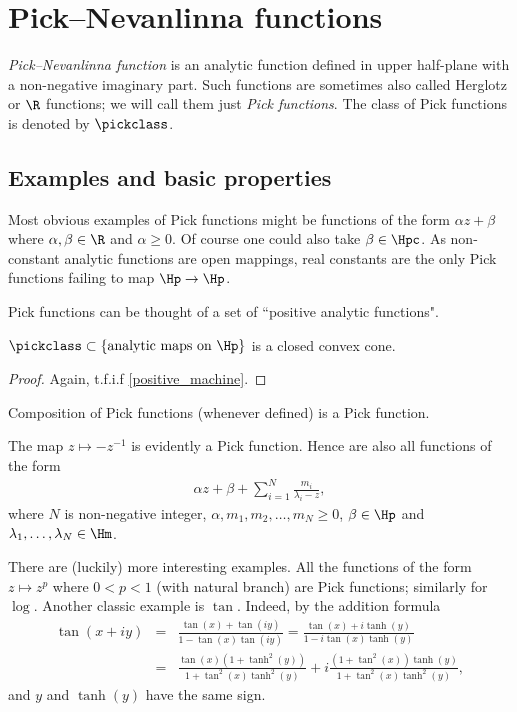 \chapter{Pick--Nevanlinna functions}

\textit{Pick--Nevanlinna function} is an analytic function defined in upper half-plane with a non-negative imaginary part. Such functions are sometimes also called Herglotz or $\R$ functions; we will call them just \textit{Pick functions}. The class of Pick functions is denoted by $\pickclass$.

\section{Examples and basic properties}

Most obvious examples of Pick functions might be functions of the form $\alpha z + \beta$ where $\alpha, \beta \in \R$ and $\alpha \geq 0$. Of course one could also take $\beta \in \Hpc$. As non-constant analytic functions are open mappings, real constants are the only Pick functions failing to map $\Hp \to \Hp$.

Pick functions can be thought of a set of ``positive analytic functions".

\begin{lause}
	$\pickclass \subset \{\text{analytic maps on $\Hp$} \}$ is a closed convex cone.
\end{lause}
\begin{proof}
	Again, t.f.i.f \ref{positive_machine}.
\end{proof}

Composition of Pick functions (whenever defined) is a Pick function.

The map $z \mapsto -z^{-1}$ is evidently a Pick function. Hence are also all functions of the form
\begin{align*}
	\alpha z + \beta + \sum_{i = 1}^{N} \frac{m_{i}}{\lambda_{i}- z},
\end{align*}
where $N$ is non-negative integer, $\alpha, m_{1}, m_{2}, \ldots, m_{N} \geq 0$, $\beta \in \Hp$ and $\lambda_{1}, \ldots, \lambda_{N} \in \Hm$.

There are (luckily) more interesting examples. All the functions of the form $z \mapsto z^{p}$ where $0 < p < 1$ (with natural branch) are Pick functions; similarly for $\log$. Another classic example is $\tan$. Indeed, by the addition formula
\begin{eqnarray*}
	\tan(x + i y) &=& \frac{\tan(x) + \tan(i y)}{1 - \tan(x) \tan(i y)} = \frac{\tan(x) + i \tanh(y)}{1 - i \tan(x) \tanh(y)} \\
	&=& \frac{\tan(x)(1 + \tanh^2(y))}{1 + \tan^2(x) \tanh^2(y)} + i \frac{(1 + \tan^2(x))\tanh(y)}{1 + \tan^2(x) \tanh^2(y)},
\end{eqnarray*}
and $y$ and $\tanh(y)$ have the same sign.

